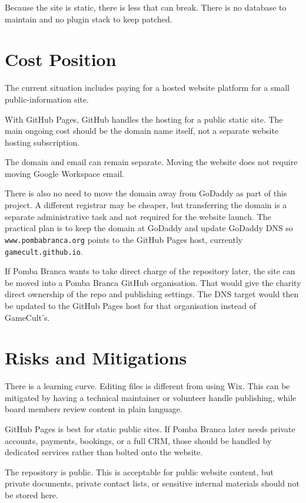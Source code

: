 \documentclass[10pt]{article}
\newcommand{\sectionrule}{\vspace{-0.45em}{\color{PombaBlue}\hrule height 0.8pt}\vspace{0.55em}}
\begin{document}
Because the site is static, there is less that can break. There is no database to maintain and no plugin stack to keep patched.

\section*{Cost Position}
\sectionrule

The current situation includes paying for a hosted website platform for a small public-information site.

With GitHub Pages, GitHub handles the hosting for a public static site. The main ongoing cost should be the domain name itself, not a separate website hosting subscription.

The domain and email can remain separate. Moving the website does not require moving Google Workspace email.

There is also no need to move the domain away from GoDaddy as part of this project. A different registrar may be cheaper, but transferring the domain is a separate administrative task and not required for the website launch. The practical plan is to keep the domain at GoDaddy and update GoDaddy DNS so \texttt{www.pombabranca.org} points to the GitHub Pages host, currently \texttt{gamecult.github.io}.

If Pomba Branca wants to take direct charge of the repository later, the site can be moved into a Pomba Branca GitHub organisation. That would give the charity direct ownership of the repo and publishing settings. The DNS target would then be updated to the GitHub Pages host for that organisation instead of GameCult's.

\section*{Risks and Mitigations}
\sectionrule

There is a learning curve. Editing files is different from using Wix. This can be mitigated by having a technical maintainer or volunteer handle publishing, while board members review content in plain language.

GitHub Pages is best for static public sites. If Pomba Branca later needs private accounts, payments, bookings, or a full CRM, those should be handled by dedicated services rather than bolted onto the website.

The repository is public. This is acceptable for public website content, but private documents, private contact lists, or sensitive internal materials should not be stored here.
\end{document}
